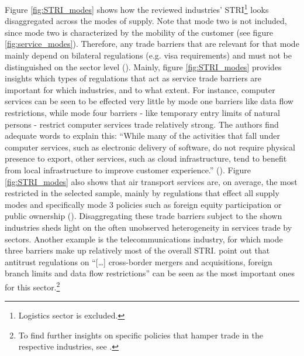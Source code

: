 Figure \ref{fig:STRI_modes} shows how the reviewed industries' STRI\footnote{Logistics sector is excluded.} looks disaggregated across the modes of supply. Note that mode two is not included, since mode two is characterized by the mobility of the customer (see figure \ref{fig:service_modes}). Therefore, any trade barriers that are relevant for that mode mainly depend on bilateral regulations (e.g. visa requirements) and must not be distinguished on the sector level (\cite{intangible_2023}). Mainly, figure \ref{fig:STRI_modes} provides insights which types of regulations that act as service trade barriers are important for which industries, and to what extent. For instance, computer services can be seen to be effected very little by mode one barriers like data flow restrictions, while mode four barriers - like temporary entry limits of natural persons - restrict computer services trade relatively strong. The authors find adequate words to explain this: \enquote{While many of the activities that fall under computer services, such as electronic delivery of software, do not require physical presence to export, other services, such as cloud infrastructure, tend to benefit from local infrastructure to improve customer experience.} (\cite{intangible_2023}). Figure \ref{fig:STRI_modes} also shows that air transport services are, on average, the most restricted in the selected sample, mainly by regulations that effect all supply modes and specifically mode 3 policies such as foreign equity participation or public ownership (\cite{intangible_2023}). Disaggregating these trade barriers subject to the shown industries sheds light on the often unobserved heterogeneity in services trade by sectors. Another example is the telecommunications industry, for which mode three barriers make up relatively most of the overall STRI. \textcite{intangible_2023} point out that antitrust regulations on \enquote{[…] cross-border mergers and acquisitions, foreign branch limits and data flow restrictions} can be seen as the most important ones for this sector.\footnote{To find further insights on specific policies that hamper trade in the respective industries, see \textcite{intangible_2023}.} 

